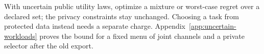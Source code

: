 With uncertain public utility laws, optimize a mixture or worst-case
regret over a declared set; the privacy constraints stay unchanged.
Choosing a task from protected data instead needs a separate charge.
Appendix~\ref{app:uncertain-workloads} proves the bound for a fixed menu
of joint channels and a private selector after the old export.

